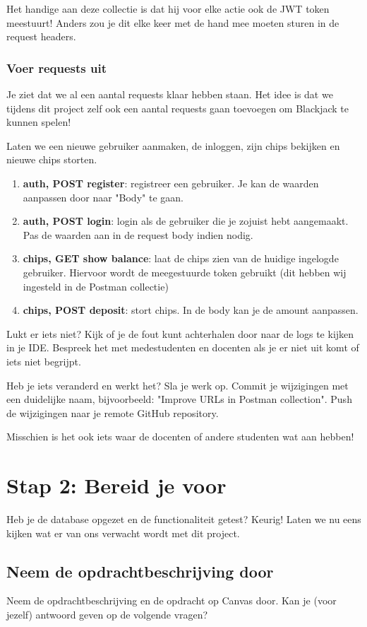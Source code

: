 Het handige aan deze collectie is dat hij voor elke actie ook 
de JWT token meestuurt! Anders zou je dit elke keer met de hand 
mee moeten sturen in de request headers.

\subsubsection{Voer requests uit}
Je ziet dat we al een aantal requests klaar hebben staan.
Het idee is dat we tijdens dit project zelf ook een aantal requests
gaan toevoegen om Blackjack te kunnen spelen!

Laten we een nieuwe gebruiker aanmaken, de inloggen, zijn chips bekijken en nieuwe chips storten.
\begin{enumerate}
    \item \textbf{auth, POST register}: registreer een gebruiker.
    Je kan de waarden aanpassen door naar "Body" te gaan.
    \item \textbf{auth, POST login}: login als de gebruiker die je zojuist
    hebt aangemaakt. Pas de waarden aan in de request body indien nodig.
    \item \textbf{chips, GET show balance}: laat de chips zien van de huidige 
    ingelogde gebruiker. Hiervoor wordt de meegestuurde token gebruikt
    (dit hebben wij ingesteld in de Postman collectie)
    \item \textbf{chips, POST deposit}: stort chips.
    In de body kan je de amount aanpassen.
\end{enumerate}

Lukt er iets niet? Kijk of je de fout kunt achterhalen door 
naar de logs te kijken in je IDE. Bespreek het met medestudenten 
en docenten als je er niet uit komt of iets niet begrijpt.

Heb je iets veranderd en werkt het? Sla je werk op. 
Commit je wijzigingen met een duidelijke naam, 
bijvoorbeeld: "Improve URLs in Postman collection". 
Push de wijzigingen naar je remote GitHub repository.

Misschien is het ook iets waar de docenten of andere studenten 
wat aan hebben!

\newpage
\section{Stap 2: Bereid je voor}
Heb je de database opgezet en de functionaliteit getest? Keurig!
Laten we nu eens kijken wat er van ons verwacht wordt met dit project.

\subsection{Neem de opdrachtbeschrijving door}
Neem de opdrachtbeschrijving en de opdracht op Canvas door. 
Kan je (voor jezelf) antwoord geven op de volgende vragen?

